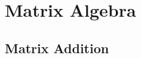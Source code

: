 \documentclass[12pt]{report}
\begin{document}
\section{Matrix Algebra}

\subsection{Matrix Addition}
\end{document}
